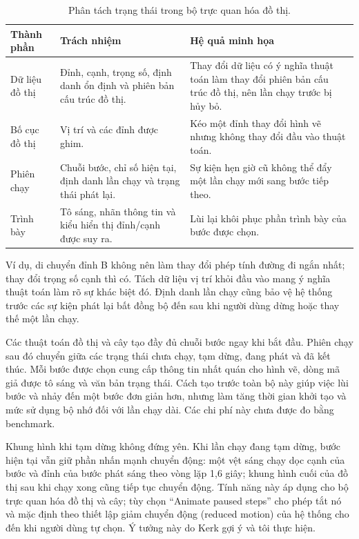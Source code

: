 \documentclass[11pt,a4paper]{article}
\begin{document}
\begin{table}[htbp]\small\centering
\caption{Phân tách trạng thái trong bộ trực quan hóa đồ thị.}\label{tab:state}
\begin{tabularx}{\linewidth}{@{}p{28mm}Y Y@{}}\toprule
Thành phần & Trách nhiệm & Hệ quả minh họa\\\midrule
Dữ liệu đồ thị & Đỉnh, cạnh, trọng số, định danh ổn định và phiên bản cấu trúc đồ thị. & Thay đổi dữ liệu có ý nghĩa thuật toán làm thay đổi phiên bản cấu trúc đồ thị, nên lần chạy trước bị hủy bỏ.\\
Bố cục đồ thị & Vị trí và các đỉnh được ghim. & Kéo một đỉnh thay đổi hình vẽ nhưng không thay đổi đầu vào thuật toán.\\
Phiên chạy & Chuỗi bước, chỉ số hiện tại, định danh lần chạy và trạng thái phát lại. & Sự kiện hẹn giờ cũ không thể đẩy một lần chạy mới sang bước tiếp theo.\\
Trình bày & Tô sáng, nhãn thông tin và kiểu hiển thị đỉnh/cạnh được suy ra. & Lùi lại khôi phục phần trình bày của bước được chọn.\\\bottomrule
\end{tabularx}
\end{table}

Ví dụ, di chuyển đỉnh B không nên làm thay đổi phép tính đường đi ngắn nhất; thay đổi trọng số cạnh thì có. Tách dữ liệu vị trí khỏi đầu vào mang ý nghĩa thuật toán làm rõ sự khác biệt đó. Định danh lần chạy cũng bảo vệ hệ thống trước các sự kiện phát lại bất đồng bộ đến sau khi người dùng dừng hoặc thay thế một lần chạy.

Các thuật toán đồ thị và cây tạo đầy đủ chuỗi bước ngay khi bắt đầu. Phiên chạy sau đó chuyển giữa các trạng thái chưa chạy, tạm dừng, đang phát và đã kết thúc. Mỗi bước được chọn cung cấp thông tin nhất quán cho hình vẽ, dòng mã giả được tô sáng và văn bản trạng thái. Cách tạo trước toàn bộ này giúp việc lùi bước và nhảy đến một bước đơn giản hơn, nhưng làm tăng thời gian khởi tạo và mức sử dụng bộ nhớ đối với lần chạy dài. Các chi phí này chưa được đo bằng benchmark.

Khung hình khi tạm dừng không đứng yên. Khi lần chạy đang tạm dừng, bước hiện tại vẫn giữ phần nhấn mạnh chuyển động: một vệt sáng chạy dọc cạnh của bước và đỉnh của bước phát sáng theo vòng lặp 1,6 giây; khung hình cuối của đồ thị sau khi chạy xong cũng tiếp tục chuyển động. Tính năng này áp dụng cho bộ trực quan hóa đồ thị và cây; tùy chọn ``Animate paused steps'' cho phép tắt nó và mặc định theo thiết lập giảm chuyển động (reduced motion) của hệ thống cho đến khi người dùng tự chọn. Ý tưởng này do Kerk gợi ý và tôi thực hiện.
\end{document}
